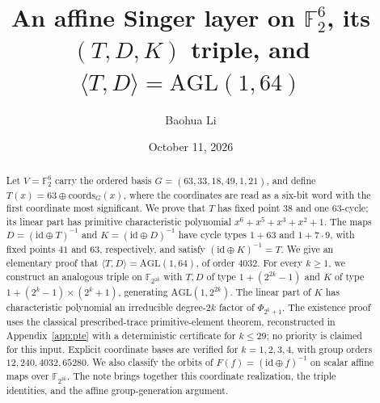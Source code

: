 \documentclass[11pt]{article}
\title{An affine Singer layer on $\mathbb{F}_2^6$, its $(T,D,K)$ triple, and $\langle T,D\rangle = \mathrm{AGL}(1,64)$}
\author{Baohua Li}
\date{October 11, 2026}
\begin{document}
\maketitle
\begin{abstract}
Let $V=\mathbb{F}_2^6$ carry the ordered basis
$G=(63,33,18,49,1,21)$, and define $T(x)=63\oplus\mathrm{coords}_G(x)$,
where the coordinates are read as a six-bit word with the first coordinate
most significant. We prove that $T$ has fixed point $38$ and one $63$-cycle;
its linear part has primitive characteristic polynomial
$x^6+x^5+x^3+x^2+1$. The maps $D=(\mathrm{id}\oplus T)^{-1}$ and
$K=(\mathrm{id}\oplus D)^{-1}$ have cycle types $1+63$ and $1+7\cdot9$,
with fixed points $41$ and $63$, respectively, and satisfy
$(\mathrm{id}\oplus K)^{-1}=T$. We give an elementary proof that
$\langle T,D\rangle=\mathrm{AGL}(1,64)$, of order $4032$.
For every $k\ge1$, we construct an analogous triple on $\mathbb{F}_{2^{2k}}$
with $T,D$ of type $1+(2^{2k}-1)$ and $K$ of type
$1+(2^k-1)\times(2^k+1)$, generating $\mathrm{AGL}(1,2^{2k})$.
The linear part of $K$ has characteristic polynomial an irreducible
degree-$2k$ factor of $\Phi_{2^k+1}$. The existence proof uses the classical
prescribed-trace primitive-element theorem, reconstructed in Appendix~\ref{app:pte}
with a deterministic certificate for $k\le29$; no priority is claimed for this input.
Explicit coordinate bases are verified for $k=1,2,3,4$, with group orders
$12,240,4032,65280$. We also classify the orbits of $F(f)=(\mathrm{id}\oplus f)^{-1}$
on scalar affine maps over $\mathbb{F}_{2^{2k}}$. The note brings together this
coordinate realization, the triple identities, and the affine group-generation argument.
\end{abstract}
\end{document}
